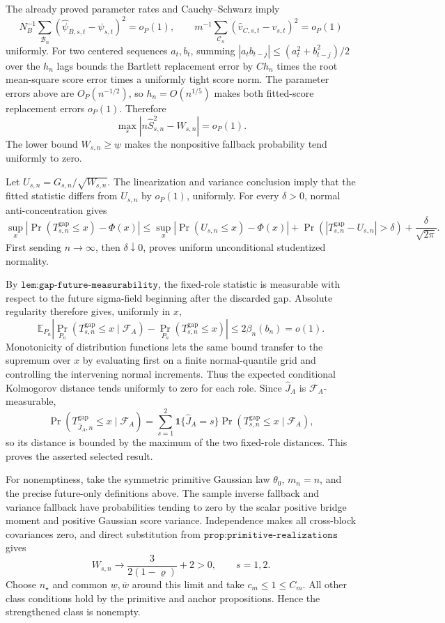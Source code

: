 The already proved parameter rates and Cauchy--Schwarz imply
\[
 N_B^{-1}\sum_{\mathcal B_n}(\widehat\psi_{B,s,t}-\psi_{s,t})^2=o_P(1),
 \qquad
 m^{-1}\sum_{\mathcal C_n}(\widehat v_{C,s,t}-v_{s,t})^2=o_P(1)
\]
uniformly.  For two centered sequences \(a_t,b_t\), summing \(|a_tb_{t-j}|\leq(a_t^2+b_{t-j}^2)/2\) over the \(h_n\) lags bounds the Bartlett replacement error by \(C h_n\) times the root mean-square score error times a uniformly tight score norm.  The parameter errors above are \(O_P(n^{-1/2})\), so \(h_n=O(n^{1/5})\) makes both fitted-score replacement errors \(o_P(1)\).  Therefore
\[
 \max_s|n\widehat S_{s,n}^2-W_{s,n}|=o_P(1).
\]
The lower bound \(W_{s,n}\geq\underline w\) makes the nonpositive fallback probability tend uniformly to zero.

Let \(U_{s,n}=G_{s,n}/\sqrt{W_{s,n}}\).  The linearization and variance conclusion imply that the fitted statistic differs from \(U_{s,n}\) by \(o_P(1)\), uniformly.  For every \(\delta>0\), normal anti-concentration gives
\[
 \sup_x|\Pr(T_{s,n}^{\mathrm{gap}}\leq x)-\Phi(x)|
 \leq \sup_x|\Pr(U_{s,n}\leq x)-\Phi(x)|
 +\Pr(|T_{s,n}^{\mathrm{gap}}-U_{s,n}|>\delta)
 +\frac{\delta}{\sqrt{2\pi}}.
\]
First sending \(n\to\infty\), then \(\delta\downarrow0\), proves uniform unconditional studentized normality.

By \(\texttt{lem:gap-future-measurability}\), the fixed-role statistic is measurable with respect to the future sigma-field beginning after the discarded gap.  Absolute regularity therefore gives, uniformly in \(x\),
\[
 \mathbb E_{P_n}\left|
 \Pr_{P_n}(T_{s,n}^{\mathrm{gap}}\leq x\mid\mathcal F_A)
 -\Pr_{P_n}(T_{s,n}^{\mathrm{gap}}\leq x)
 \right|\leq2\beta_n(b_n)=o(1).
\]
Monotonicity of distribution functions lets the same bound transfer to the supremum over \(x\) by evaluating first on a finite normal-quantile grid and controlling the intervening normal increments.  Thus the expected conditional Kolmogorov distance tends uniformly to zero for each role.  Since \(\widehat J_A\) is \(\mathcal F_A\)-measurable,
\[
 \Pr(T_{\widehat J_A,n}^{\mathrm{gap}}\leq x\mid\mathcal F_A)
 =\sum_{s=1}^2\mathbf1\{\widehat J_A=s\}
  \Pr(T_{s,n}^{\mathrm{gap}}\leq x\mid\mathcal F_A),
\]
so its distance is bounded by the maximum of the two fixed-role distances.  This proves the asserted selected result.

For nonemptiness, take the symmetric primitive Gaussian law \(\theta_0\), \(m_n=n\), and the precise future-only definitions above.  The sample inverse fallback and variance fallback have probabilities tending to zero by the scalar positive bridge moment and positive Gaussian score variance.  Independence makes all cross-block covariances zero, and direct substitution from \(\texttt{prop:primitive-realizations}\) gives
\[
 W_{s,n}\to\frac{3}{2(1-\varrho)}+2>0,
 \qquad s=1,2.
\]
Choose \(n_\star\) and common \(\underline w,\overline w\) around this limit and take \(c_m\leq1\leq C_m\).  All other class conditions hold by the primitive and anchor propositions.  Hence the strengthened class is nonempty.

